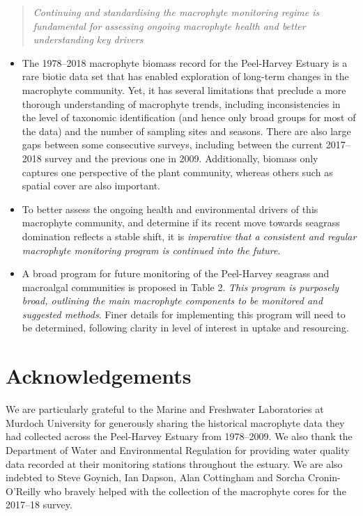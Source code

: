 \documentclass[
]{book}
\begin{document}
\begin{quote}
\emph{Continuing and standardising the macrophyte monitoring regime is fundamental for assessing ongoing macrophyte health and better understanding key drivers}
\end{quote}

\begin{itemize}
\item
  The 1978--2018 macrophyte biomass record for the Peel-Harvey Estuary is a rare biotic data set that has enabled exploration of long-term changes in the macrophyte community. Yet, it has several limitations that preclude a more thorough understanding of macrophyte trends, including inconsistencies in the level of taxonomic identification (and hence only broad groups for most of the data) and the number of sampling sites and seasons. There are also large gaps between some consecutive surveys, including between the current 2017--2018 survey and the previous one in 2009. Additionally, biomass only captures one perspective of the plant community, whereas others such as spatial cover are also important.
\item
  To better assess the ongoing health and environmental drivers of this macrophyte community, and determine if its recent move towards seagrass domination reflects a stable shift, it is \emph{imperative that a consistent and regular macrophyte monitoring program is continued into the future}.
\item
  A broad program for future monitoring of the Peel-Harvey seagrass and macroalgal communities is proposed in Table 2. \emph{This program is purposely broad, outlining the main macrophyte components to be monitored and suggested methods}. Finer details for implementing this program will need to be determined, following clarity in level of interest in uptake and resourcing.
\end{itemize}

\hypertarget{acknowledgements-2}{%
\section{Acknowledgements}\label{acknowledgements-2}}

We are particularly grateful to the Marine and Freshwater Laboratories at Murdoch University for generously sharing the historical macrophyte data they had collected across the Peel-Harvey Estuary from 1978--2009. We also thank the Department of Water and Environmental Regulation for providing water quality data recorded at their monitoring stations throughout the estuary. We are also indebted to Steve Goynich, Ian Dapson, Alan Cottingham and Sorcha Cronin-O'Reilly who bravely helped with the collection of the macrophyte cores for the 2017--18 survey.\\
\end{document}
